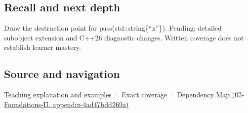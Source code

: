 \subsection{Recall and next depth}\label{appendix-a978b29bbbb0-recall-and-next-depth}

Draw the destruction point for pass(std::string\{``x''\}). Pending: detailed subobject extension and C++26 diagnostic changes. Written coverage does not establish learner mastery.

\subsection{Source and navigation}\label{appendix-a978b29bbbb0-source-and-navigation}

\hyperref[01-foundations-i-ch003-a-temporary-needs-an-explicit-lifetime-story]{Teaching explanation and examples} · \hyperref[appendix-fd090d982a15-m008---parts-113-126]{Exact coverage} · \href{../02-Foundations-II/main.pdf\#nameddest=appendix-4ad47bdd269a}{Dependency Map (02-Foundations-II, appendix-4ad47bdd269a)}
